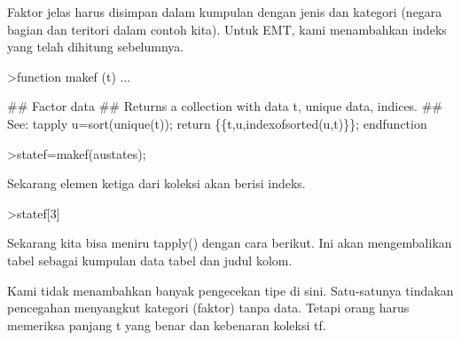 \documentclass[a4paper,10pt]{article}
\begin{document}
\begin{eulernotebook}
\begin{eulercomment}
\begin{eulercomment}
\begin{eulercomment}
\begin{eulercomment}
\begin{eulercomment}
\begin{eulercomment}
\begin{eulercomment}
\begin{eulercomment}
\begin{eulercomment}
\begin{eulercomment}
\begin{eulercomment}
\begin{eulercomment}
\begin{eulercomment}
\begin{eulercomment}
\begin{eulercomment}
\begin{eulercomment}
\begin{eulercomment}
\begin{eulercomment}
\begin{eulercomment}
Faktor jelas harus disimpan dalam kumpulan dengan jenis dan kategori
(negara bagian dan teritori dalam contoh kita). Untuk EMT, kami
menambahkan indeks yang telah dihitung sebelumnya.
\end{eulercomment}
\begin{eulerprompt}
>function makef (t) ...
\end{eulerprompt}
\begin{eulerudf}
  ## Factor data
  ## Returns a collection with data t, unique data, indices.
  ## See: tapply
  u=sort(unique(t));
  return \{\{t,u,indexofsorted(u,t)\}\};
  endfunction
\end{eulerudf}
\begin{eulerprompt}
>statef=makef(austates);
\end{eulerprompt}
\begin{eulercomment}
Sekarang elemen ketiga dari koleksi akan berisi indeks.
\end{eulercomment}
\begin{eulerprompt}
>statef[3]
\end{eulerprompt}
\begin{euleroutput}
  [6,  5,  4,  2,  2,  3,  8,  8,  4,  7,  2,  7,  4,  4,  5,  6,  5,  3,
  8,  7,  4,  2,  2,  8,  5,  1,  2,  7,  7,  1]
\end{euleroutput}
\begin{eulercomment}
Sekarang kita bisa meniru tapply() dengan cara berikut. Ini akan
mengembalikan tabel sebagai kumpulan data tabel dan judul kolom.
\end{eulercomment}
\begin{eulercomment}
Kami tidak menambahkan banyak pengecekan tipe di sini. Satu-satunya
tindakan pencegahan menyangkut kategori (faktor) tanpa data. Tetapi
orang harus memeriksa panjang t yang benar dan kebenaran koleksi tf.


\end{eulercomment}
\end{eulercomment}
\end{eulercomment}
\end{eulercomment}
\end{eulercomment}
\end{eulercomment}
\end{eulercomment}
\end{eulercomment}
\end{eulercomment}
\end{eulercomment}
\end{eulercomment}
\end{eulercomment}
\end{eulercomment}
\end{eulercomment}
\end{eulercomment}
\end{eulercomment}
\end{eulercomment}
\end{eulercomment}
\end{eulercomment}
\end{eulernotebook}
\end{document}
